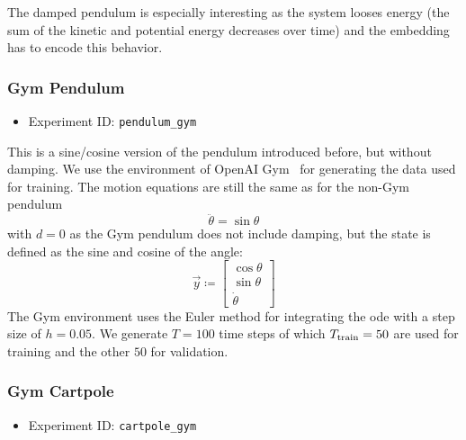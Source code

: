 			The damped pendulum is especially interesting as the system looses energy (\ie the sum of the kinetic and potential energy decreases over time) and the embedding has to encode this behavior.

		\subsubsection{Gym Pendulum}
			\label{subsubsec:gymPendulum}

			\begin{itemize}
				\item Experiment ID: \texttt{pendulum\_gym}
			\end{itemize}

			This is a sine/cosine version of the pendulum introduced before, but without damping. We use the environment of OpenAI Gym~\cite{brockmanOpenAIGym2016} for generating the data used for training. The motion equations are still the same as for the non-Gym pendulum
			\begin{equation*}
				\ddot{\theta} = \sin\theta
			\end{equation*}
			with \( d = 0 \) as the Gym pendulum does not include damping, but the state is defined as the sine and cosine of the angle:
			\begin{equation*}
				\vec{y} \coloneqq
					\begin{bmatrix}
						\cos\theta \\
						\sin\theta \\
						\dot{\theta}
					\end{bmatrix}
			\end{equation*}
			The Gym environment uses the Euler method for integrating the \ac{ode} with a step size of \( h = 0.05 \). We generate \( T = 100 \) time steps of which \( T_{\mathrm{train}} = 50 \) are used for training and the other \(50\) for validation.

		\subsubsection{Gym Cartpole}
			\label{subsubsec:cartpole}

			\begin{itemize}
				\item Experiment ID: \texttt{cartpole\_gym}
			\end{itemize}

